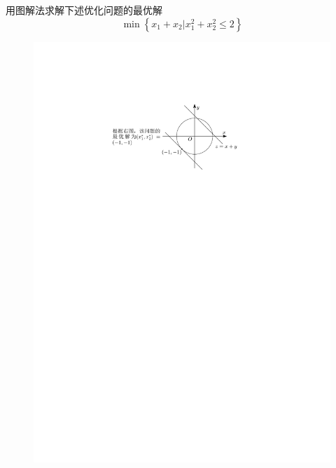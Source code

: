 \begin{example}
    用图解法求解下述优化问题的最优解
    \[
        \min\left\{ x_1+x_2|x_1^2+x_2^2\leqslant 2 \right\}
    \]
    \begin{figure}[htbp]
        \centering
        \includegraphics{image/习题-图解法最优.pdf}
    \end{figure}
\end{example}
